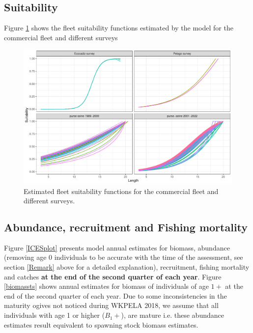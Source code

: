 \documentclass[review]{elsarticle}
\begin{document}
\subsection{Suitability}

Figure \ref{suitability} shows the fleet suitability functions estimated by the model for the commercial fleet and different surveys 
\begin{figure}[h!]
 \centering
 \includegraphics[bb=0 0 667 432]{./suitability.pdf}
 \caption{Estimated fleet suitability functions for the commercial fleet and different surveys.}
 \label{suitability}
\end{figure}



\subsection{Abundance, recruitment and Fishing mortality}\label{ARF}

Figure \ref{ICESplot} presents model annual estimates for biomass, abundance (removing age 0 individuals to be accurate with the time of the assessment, see section \ref{Remark} above for a detailed explanation), recruitment, fishing mortality and catches \textbf{at the end of the second quarter of each year}. Figure \ref{biomassts} shows annual estimates for biomass of individuals of age $1+$ at the end of the second quarter of each year. Due to some inconsistencies in the maturity ogives not noticed during WKPELA 2018, we assume that all individuals with age 1 or higher ($B_1+$), are mature i.e. these abundance estimates result equivalent to spawning stock biomass estimates.
\end{document}
